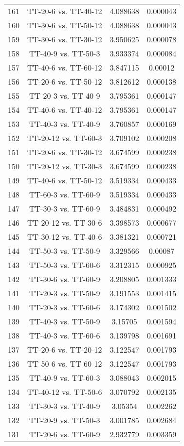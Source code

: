 \documentclass[a4paper,10pt]{article}
\begin{document}
\begin{landscape}
\begin{table}[!htp]
\begin{tabular}{cccc}
161&TT-20-6 vs. TT-40-12&4.088638&0.000043\\
160&TT-30-6 vs. TT-50-12&4.088638&0.000043\\
159&TT-30-6 vs. TT-30-12&3.950625&0.000078\\
158&TT-40-9 vs. TT-50-3&3.933374&0.000084\\
157&TT-40-6 vs. TT-60-12&3.847115&0.00012\\
156&TT-20-6 vs. TT-50-12&3.812612&0.000138\\
155&TT-20-3 vs. TT-40-9&3.795361&0.000147\\
154&TT-40-6 vs. TT-40-12&3.795361&0.000147\\
153&TT-40-3 vs. TT-40-9&3.760857&0.000169\\
152&TT-20-12 vs. TT-60-3&3.709102&0.000208\\
151&TT-20-6 vs. TT-30-12&3.674599&0.000238\\
150&TT-20-12 vs. TT-30-3&3.674599&0.000238\\
149&TT-40-6 vs. TT-50-12&3.519334&0.000433\\
148&TT-60-3 vs. TT-60-9&3.519334&0.000433\\
147&TT-30-3 vs. TT-60-9&3.484831&0.000492\\
146&TT-20-12 vs. TT-30-6&3.398573&0.000677\\
145&TT-30-12 vs. TT-40-6&3.381321&0.000721\\
144&TT-50-3 vs. TT-50-9&3.329566&0.00087\\
143&TT-50-3 vs. TT-60-6&3.312315&0.000925\\
142&TT-30-6 vs. TT-60-9&3.208805&0.001333\\
141&TT-20-3 vs. TT-50-9&3.191553&0.001415\\
140&TT-20-3 vs. TT-60-6&3.174302&0.001502\\
139&TT-40-3 vs. TT-50-9&3.15705&0.001594\\
138&TT-40-3 vs. TT-60-6&3.139798&0.001691\\
137&TT-20-6 vs. TT-20-12&3.122547&0.001793\\
136&TT-50-6 vs. TT-60-12&3.122547&0.001793\\
135&TT-40-9 vs. TT-60-3&3.088043&0.002015\\
134&TT-40-12 vs. TT-50-6&3.070792&0.002135\\
133&TT-30-3 vs. TT-40-9&3.05354&0.002262\\
132&TT-20-9 vs. TT-50-3&3.001785&0.002684\\
131&TT-20-6 vs. TT-60-9&2.932779&0.003359\\

\end{tabular}
\end{table}
\end{landscape}
\end{document}
